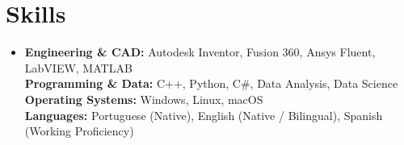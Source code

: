\documentclass[10pt, letterpaper]{article}
\begin{document}
\section{Skills}
\begin{itemize}[leftmargin=0.15in, label={}, itemsep=2pt]
  \small\item
  \textbf{\color{accent}Engineering \& CAD:} Autodesk Inventor, Fusion 360, Ansys Fluent, LabVIEW, MATLAB \\
  \textbf{\color{accent}Programming \& Data:} C++, Python, C\#, Data Analysis, Data Science \\
  \textbf{\color{accent}Operating Systems:} Windows, Linux, macOS \\
  \textbf{\color{accent}Languages:} Portuguese (Native), English (Native / Bilingual), Spanish (Working Proficiency)
\end{itemize}
\end{document}
